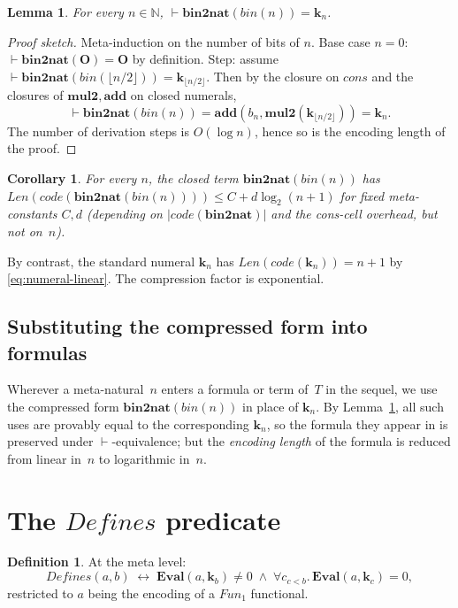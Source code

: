 \documentclass[11pt]{article}
\theoremstyle{plain}
\newtheorem{lemma}[theorem]{Lemma}
\newtheorem{corollary}[theorem]{Corollary}
\theoremstyle{definition}
\newtheorem{definition}[theorem]{Definition}
\theoremstyle{remark}
\newcommand{\code}[1]{\mathit{code}(#1)}
\newcommand{\Fun}{\mathit{Fun}}
\newcommand{\Defines}{\mathit{Defines}}
\newcommand{\Len}{\mathit{Len}}
\newcommand{\Eval}{\mathbf{Eval}}
\newcommand{\bnt}{\mathbf{bin2nat}}
\newcommand{\bin}{\mathit{bin}}
\newcommand{\cons}{\mathit{cons}}
\newcommand{\mul}{\mathbf{mul2}}
\newcommand{\add}{\mathbf{add}}
\begin{document}
\begin{lemma}\label{lem:bin-correct}
For every $n \in \mathbb{N}$, $\vdash \bnt(\bin(n)) = \mathbf{k}_n$.
\end{lemma}

\begin{proof}[Proof sketch]
Meta-induction on the number of bits of $n$.  Base case $n = 0$:
$\vdash \bnt(\mathbf{O}) = \mathbf{O}$ by definition.  Step: assume
$\vdash \bnt(\bin(\lfloor n/2 \rfloor)) = \mathbf{k}_{\lfloor n/2
\rfloor}$.  Then by the closure on $\cons$ and the closures of $\mul,
\add$ on closed numerals,
$$
\vdash \bnt(\bin(n)) = \add(b_n, \mul(\mathbf{k}_{\lfloor n/2 \rfloor})) = \mathbf{k}_n.
$$
The number of derivation steps is $O(\log n)$, hence so is the
encoding length of the proof.
\end{proof}

\begin{corollary}\label{cor:bin-len}
For every $n$, the closed term $\bnt(\bin(n))$ has
$\Len(\code{\bnt(\bin(n))}) \leq C + d \log_2(n + 1)$ for fixed
meta-constants $C, d$ (depending on $|\code{\bnt}|$ and the cons-cell
overhead, but not on~$n$).
\end{corollary}

\noindent
By contrast, the standard numeral $\mathbf{k}_n$ has
$\Len(\code{\mathbf{k}_n}) = n + 1$ by
\eqref{eq:numeral-linear}.  The compression factor is exponential.

\subsection{Substituting the compressed form into formulas}

Wherever a meta-natural~$n$ enters a formula or term of~$T$ in the
sequel, we use the compressed form $\bnt(\bin(n))$ in place of
$\mathbf{k}_n$.  By Lemma~\ref{lem:bin-correct}, all such uses are
provably equal to the corresponding $\mathbf{k}_n$, so the formula
they appear in is preserved under $\vdash$-equivalence; but the
\emph{encoding length} of the formula is reduced from linear in~$n$
to logarithmic in~$n$.

\section{The $\Defines$ predicate}

\begin{definition}\label{def:defines}
At the meta level:
$$
\Defines(a, b) \;\leftrightarrow\;
\Eval(a, \mathbf{k}_b) \neq 0 \;\wedge\; \forall c_{c < b}.\,\Eval(a, \mathbf{k}_c) = 0,
$$
restricted to $a$ being the encoding of a $\Fun_1$ functional.
\end{definition}
\end{document}
